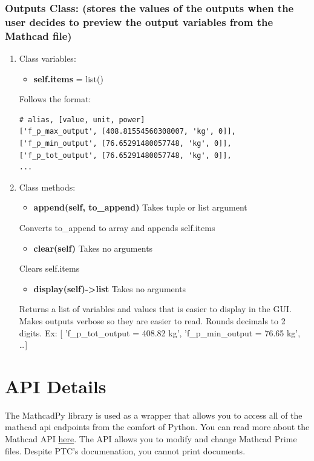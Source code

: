 \documentclass[11pt]{article}
\begin{document}
\subsubsection{Outputs Class: (stores the values of the outputs when the user decides to preview the output variables from the Mathcad file)}
\label{sec:org9e21790}
\begin{enumerate}
\item Class variables:
\label{sec:orgff94237}

\begin{itemize}
\item \textbf{self.items} = list()
\end{itemize}
Follows the format:
\begin{verbatim}
# alias, [value, unit, power]
['f_p_max_output', [408.81554560308007, 'kg', 0]],
['f_p_min_output', [76.65291480057748, 'kg', 0]],
['f_p_tot_output', [76.65291480057748, 'kg', 0]],
...
\end{verbatim}
\item Class methods:
\label{sec:orgc548774}
\begin{itemize}
\item \textbf{append(self, to\_append)} Takes tuple or list argument
\end{itemize}
Converts to\_append to array and appends self.items

\begin{itemize}
\item \textbf{clear(self)} Takes no arguments
\end{itemize}
Clears self.items

\begin{itemize}
\item \textbf{display(self)->list} Takes no arguments
\end{itemize}
Returns a list of variables and values that is easier to display in the GUI. Makes outputs verbose so they are easier to read. Rounds decimals to 2 digits. 
Ex: [ 'f\_p\_tot\_output = 408.82 kg', 'f\_p\_min\_output = 76.65 kg', \ldots{}]
\end{enumerate}

\section{API Details}
\label{sec:orgd3ec049}

The MathcadPy library is used as a wrapper that allows you to access all of the mathcad api endpoints from the comfort of Python. You can read more about the Mathcad API \href{https://support.ptc.com/help/mathcad/r7.0/en/index.html\#page/PTC\_Mathcad\_Help\%2Fmathcad\_and\_automation\_api.html\%23}{here}. The API allows you to modify and change Mathcad Prime files. Despite PTC's documenation, you cannot print documents.
\end{document}
